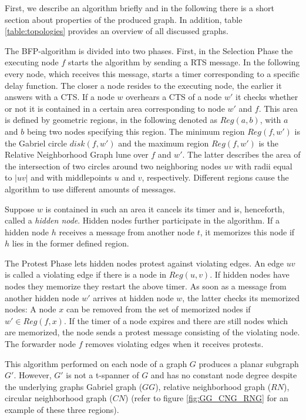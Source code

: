 First, we describe an algorithm briefly and in the following there is a short section about properties of the produced graph.
In addition, table \ref{table:topologies} provides an overview of all discussed graphs.

The BFP-algorithm \cite{Ruhrup2010} is divided into two phases.
First, in the Selection Phase the executing node $f $ starts the algorithm by sending a RTS message. 
In the following every node, which receives this message, starts a timer corresponding to a specific delay function.
The closer a node resides to the executing node, the earlier it answers with a CTS. 
If a node $w $ overhears a CTS of a node $w' $ it checks whether or not it is contained in a certain area corresponding to node $w' $ and $f $.
This area is defined by geometric regions, in the following denoted as $Reg(a, b) $, with $a $ and $b $ being two nodes specifying this region.
The minimum region $Reg(f, w') $ is the Gabriel circle $disk(f, w') $ and the maximum region $Reg(f, w') $ is the Relative Neighborhood Graph lune over $f $ and $w' $.
The latter describes the area of the intersection of two circles around two neighboring nodes $uv $ with radii equal to $|uv| $ and with middlepoints $u $ and $v $, respectively.
Different regions cause the algorithm to use different amounts of messages.

Suppose $w $ is contained in such an area it cancels its timer and is, henceforth, called a \emph{hidden node}.
Hidden nodes further participate in the algorithm.
If a hidden node $h $ receives a message from another node $t $, it memorizes this node if $h $ lies in the former defined region. 

The Protest Phase lets hidden nodes protest against violating edges.
An edge $uv $ is called a violating edge if there is a node in $Reg(u, v) $.
If hidden nodes have nodes they memorize they restart the above timer.
As soon as a message from another hidden node $w' $ arrives at hidden node $w $, the latter checks its memorized nodes:
A node $x $ can be removed from the set of memorized nodes if $w' \in Reg(f,x) $.
If the timer of a node expires and there are still nodes which are memorized, the node sends a protest message consisting of the violating node.
The forwarder node $f $ removes violating edges when it receives protests.

This algorithm performed on each node of a graph $G $ produces a planar subgraph $G' $.
However, $G' $ is not a t-spanner of $G $ and has no constant node degree despite the underlying graphs Gabriel graph ($GG $), relative neighborhood graph ($RN $), circular neighborhood graph ($CN$) (refer to figure \ref{fig:GG_CNG_RNG} for an example of these three regions).


